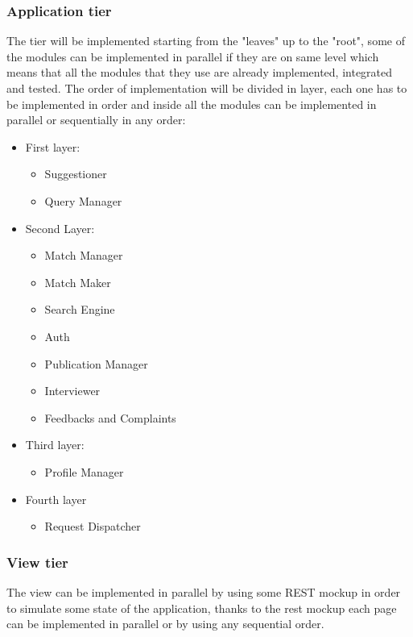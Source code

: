 \documentclass{article}
\begin{document}
\subsubsection{Application tier}
The tier will be implemented starting from the "leaves" up to the "root", some of the modules can be implemented in parallel if they are on same level which means that all the modules that they use are already implemented, integrated and tested. The order of implementation will be divided in layer, each one has to be implemented in order and inside all the modules can be implemented in parallel or sequentially in any order: 
\begin{itemize}
    \item First layer: 
    \begin{itemize}
        \item Suggestioner
        \item Query Manager
    \end{itemize}
    \item Second Layer:
    \begin{itemize}
        \item Match Manager 
        \item Match Maker
        \item Search Engine 
        \item Auth 
        \item Publication Manager
        \item Interviewer 
        \item Feedbacks and Complaints 
    \end{itemize}
\item Third layer:
\begin{itemize}
    \item Profile Manager 
\end{itemize}
\item Fourth layer
\begin{itemize}
    \item Request Dispatcher 
\end{itemize}
\end{itemize}
\subsubsection{View tier}
The view can be implemented in parallel by using some REST mockup in order to simulate some state of the application, thanks to the rest mockup each page can be implemented in parallel or by using any sequential order.
\end{document}
